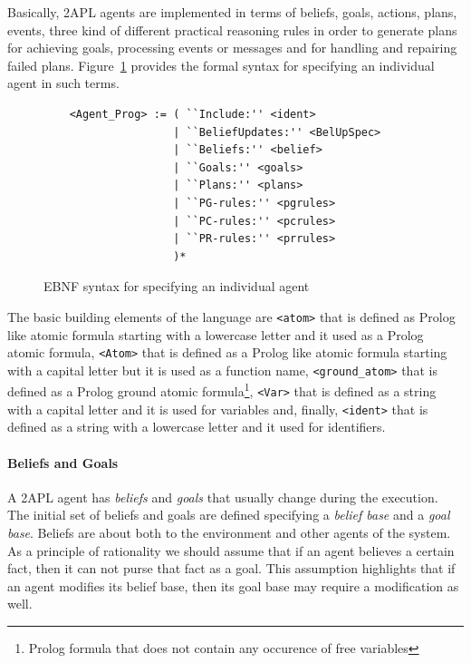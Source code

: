 \documentclass[a4paper]{article}
\begin{document}
Basically, 2APL agents are implemented in terms of beliefs, goals, actions, plans, events, three kind of different practical reasoning rules in order to generate plans for achieving goals, processing events or messages and for handling and repairing failed plans. Figure~\ref{fig:ebnf_agent} provides the formal syntax for specifying an individual agent in such terms.

\begin{figure}[htp]
\begin{verbatim}
	<Agent_Prog> := ( ``Include:'' <ident>
	                | ``BeliefUpdates:'' <BelUpSpec>
	                | ``Beliefs:'' <belief> 
	                | ``Goals:'' <goals> 
	                | ``Plans:'' <plans>
	                | ``PG-rules:'' <pgrules>
	                | ``PC-rules:'' <pcrules>
	                | ``PR-rules:'' <prrules>
	                )*
\end{verbatim}
\caption{EBNF syntax for specifying an individual agent}
\label{fig:ebnf_agent}
\end{figure}

The basic building elements of the language are \texttt{<atom>} that is defined as Prolog like atomic formula starting with a lowercase letter and it used as a Prolog atomic formula, \texttt{<Atom>} that is defined as a Prolog like atomic formula starting with a capital letter but it is used as a function name, \texttt{<ground\_atom>} that is defined as a Prolog ground atomic formula\footnote{Prolog formula that does not contain any occurence of free variables}, \texttt{<Var>} that is defined as a string with a capital letter and it is used for variables and, finally, \texttt{<ident>} that is defined as a string with a lowercase letter and it used for identifiers.

\paragraph{Beliefs and Goals}

A 2APL agent has \emph{beliefs} and \emph{goals} that usually change during the execution. The initial set of beliefs and goals are defined specifying a \emph{belief base} and a \emph{goal base}. Beliefs are about both to the environment and other agents of the system. As a principle of rationality we should assume that if an agent believes a certain fact, then it can not purse that fact as a goal. This assumption highlights that if an agent modifies its belief base, then its goal base may require a modification as well. 
\end{document}
